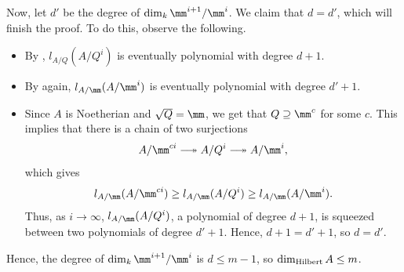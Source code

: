 Now, let $d'$ be the degree of $\dim_k\mm^{i+1}/\mm^i$.
We claim that $d=d'$, which will finish the proof.
To do this, observe the following. 
\begin{itemize}
    \item By ,
    $l_{A/Q}(A/Q^i)$ is eventually polynomial with degree $d+1$.
    \item By  again,
    $l_{A/\mm}(A/\mm^i)$ is eventually polynomial
    with degree $d'+1$.
    \item Since $A$ is Noetherian and $\sqrt Q=\mm$,
    we get that $Q\supseteq \mm^c$ for some $c$.
    This implies that there is a chain of two surjections
    $$A/\mm^{ci} \relbar\joinrel\twoheadrightarrow A/Q^i
    \relbar\joinrel\twoheadrightarrow A/\mm^i,$$
    which gives 
    $$l_{A/\mm}(A/\mm^{ci}) \geq l_{A/\mm}(A/Q^i) \geq 
    l_{A/\mm}(A/\mm^i).$$
    Thus, as $i\to\infty$,
    $l_{A/\mm}(A/Q^i)$, a polynomial of degree $d+1$,
    is squeezed between two polynomials of degree $d'+1$.
    Hence, $d+1=d'+1$, so $d=d'$.
\end{itemize}
Hence, the degree of $\dim_k \mm^{i+1}/\mm^i$
is $d\leq m-1$, so $\dim_{\text{Hilbert}} A \leq m$.

